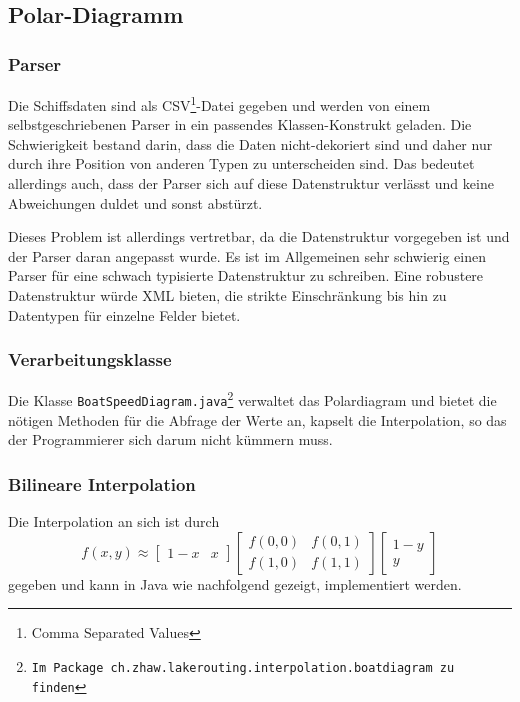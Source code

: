 \subsection{Polar-Diagramm}
\subsubsection{Parser}

Die Schiffsdaten sind als CSV\footnote{Comma Separated Values}-Datei gegeben
und werden von einem selbst\-geschriebenen Parser in ein passendes
Klassen-Konstrukt geladen. Die Schwierigkeit bestand darin, dass die Daten
nicht-dekoriert sind und daher nur durch ihre Position von anderen Typen zu
unterscheiden sind. Das bedeutet allerdings auch, dass der Parser sich auf
diese Datenstruktur verlässt und keine Abweichungen duldet und sonst abstürzt.

Dieses Problem ist allerdings vertretbar, da die Datenstruktur vorgegeben ist
und der Parser daran angepasst wurde. Es ist im Allgemeinen sehr schwierig
einen Parser für eine schwach typisierte Datenstruktur zu schreiben. Eine
robustere Datenstruktur würde XML bieten, die strikte Einschränkung bis hin zu
Datentypen für einzelne Felder bietet.

\subsubsection{Verarbeitungsklasse}
Die Klasse \texttt{BoatSpeedDiagram.java\footnote{Im Package
ch.zhaw.lakerouting.interpolation.boatdiagram zu finden}} verwaltet das
Polardiagram und bietet die nötigen Methoden für die Abfrage der Werte an,
kapselt die Interpolation, so das der Programmierer sich darum nicht kümmern
muss.

\subsubsection{Bilineare Interpolation}\label{sss:bilinearinterpolation}
Die Interpolation an sich ist durch 
\begin{equation}
f(x,y) \approx \begin{bmatrix} 1-x & x \end{bmatrix} \begin{bmatrix}
f(0,0) & f(0,1) \\ f(1,0) & f(1,1) \end{bmatrix} \begin{bmatrix} 1 - y
\\ y \end{bmatrix}
\label{eq:bilineareinterpolation}
\end{equation}
gegeben und kann in Java wie nachfolgend gezeigt, implementiert werden.

